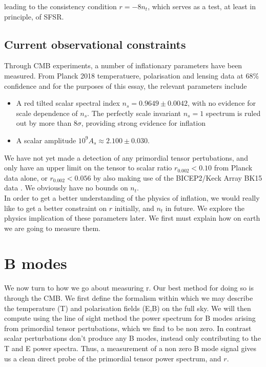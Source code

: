 \documentclass[a4paper,10pt]{article}
\begin{document}
leading to the consistency condition $r=-8n_t$, which serves as a test, at least in principle, of SFSR.


\subsection{Current observational constraints}


Through CMB experiments, a number of inflationary parameters have been measured. From Planck 2018 temperatuere, polarisation and lensing data at 68\% confidence \cite{Planck} and for the purposes of this essay, the relevant parameters include
 
\begin{itemize}
\item A red tilted scalar spectral index $n_s =0.9649 \pm 0.0042$, with no evidence for scale dependence of $n_s$. The perfectly scale invariant $n_s=1$ spectrum is ruled out by more than $8\sigma$, providing strong evidence for inflation
\item A scalar amplitude  $10^9 A_s \approx 2.100 \pm 0.030$.
\end{itemize}

We have not yet made a detection of any primordial tensor pertubations, and only have an upper limit on the tensor to scalar ratio $r_{0.002}<0.10$ from Planck data alone, or $r_{0.002}<0.056$ by also making use of the BICEP2/Keck Array BK15 data \cite{planck-inflation}. We obviously have no bounds on $n_t$.\\

In order to get a better understanding of the physics of inflation, we would really like to get a better constraint on $r$ initially, and $n_t$ in future. We explore the physics implication of these parameters later. We first must explain how on earth we are going to measure them.

\newpage

\section{B modes}

We now turn to how we go about measuring r. Our best method for doing so is through the CMB. We first define the formalism within which we may describe the temperature (T) and polarisation fields (E,B) on the full sky. We will then compute using the line of sight method the power spectrum for B modes arising from primordial tensor pertubations, which we find to be non zero. In contrast scalar perturbations don't produce any B modes, instead only contributing to the T and E power spectra. Thus, a measurement of a non zero B mode signal gives us a clean direct probe of the primordial tensor power spectrum, and $r$. 
\end{document}
